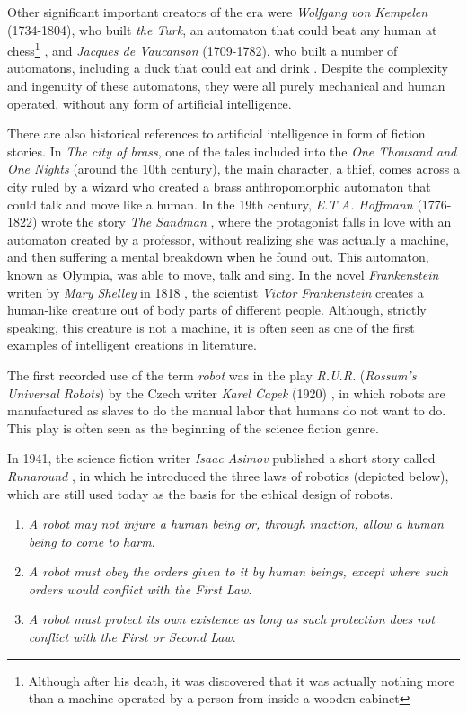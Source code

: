 Other significant important creators of the era were \textit{Wolfgang von Kempelen} (1734-1804), who built \textit{the Turk}, an automaton that could beat any human at chess\footnote{Although after his death, it was discovered that it was actually nothing more than a machine operated by a person from inside a wooden cabinet} \autocite{jay2000}, 
and \textit{Jacques de Vaucanson} (1709-1782), who built a number of automatons, including a duck that could eat and drink \autocite{nils2009, trymbaka2022}. Despite the complexity and ingenuity of these automatons, they were all purely mechanical and human operated, without any form of artificial intelligence.

There are also historical references to artificial intelligence in form of fiction stories. In \textit{The city of brass}, one of the tales included into the \textit{One Thousand and One Nights} (around the 10th century), the main character, a thief, comes across a city ruled by a wizard who created a brass anthropomorphic automaton that could talk and move like a human. In the 19th century, \textit{E.T.A. Hoffmann} (1776-1822) wrote the story \textit{The Sandman} \autocite{hoffmann1816}, where the protagonist falls in love with an automaton created by a professor, without realizing she was actually a machine, and then suffering a mental breakdown when he found out. This automaton, known as Olympia, was able to move, talk and sing. In the novel \textit{Frankenstein} writen by \textit{Mary Shelley} in 1818 \autocite{shelley1994}, the scientist \textit{Victor Frankenstein} creates a human-like creature out of body parts of different people. Although, strictly speaking, this creature is not a machine, it is often seen as one of the first examples of intelligent creations in literature.

The first recorded use of the term \textit{robot} was in the play \textit{R.U.R.} (\textit{Rossum’s Universal Robots}) by the Czech writer \textit{Karel Čapek} (1920) \autocite{nils2009}, in which robots are manufactured as slaves to do the manual labor that humans do not want to do. This play is often seen as the beginning of the science fiction genre.

In 1941, the science fiction writer \textit{Isaac Asimov} published a short story called \textit{Runaround} \autocite{nils2009}, in which he introduced the three laws of robotics (depicted below), which are still used today as the basis for the ethical design of robots.


\begin{enumerate}

	\item \textit{A robot may not injure a human being or, through inaction, allow a human being to come to harm}.

	\item \textit{A robot must obey the orders given to it by human beings, except where such orders would conflict with the First Law}.

	\item \textit{A robot must protect its own existence as long as such protection does not conflict with the First or Second Law}.

\end{enumerate}

